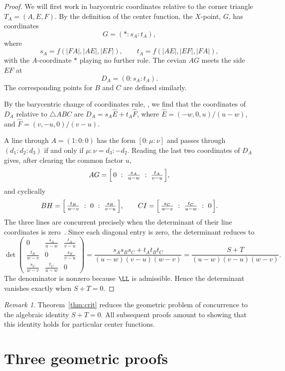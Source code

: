 \documentclass[12pt,a4paper]{amsart}
\theoremstyle{remark}
\newtheorem{remark}[theorem]{Remark}
\begin{document}
\begin{proof}
We will first work in barycentric coordinates relative to the corner triangle
$T_A=(A,E,F)$.
By the definition of the center function, the $X$-point, $G$, has coordinates
\[
G=(*:s_A:t_A),
\]
where
\[
s_A=f(|FA|,|AE|,|EF|),\qquad
t_A=f(|AE|,|EF|,|FA|),
\]
with the $A$-coordinate $\ast$ playing no further role.
The cevian $AG$ meets the side $EF$ at
\[
D_A=(0:s_A:t_A).
\]
The corresponding points for $B$ and $C$ are defined similarly.

By the barycentric change of coordinates rule, \cite[eq.~(10)]{Grozdev},
we find that the coordinates of $D_A$ relative to $\triangle ABC$ are $D_A=s_A\widehat E+t_A\widehat F$,
where $\widehat E=(-w,0,u)/(u-w)$, and $\widehat F=(v,-u,0)/(v-u)$.

A line through
$A=(1:0:0)$ has the form $[0:\mu:\nu]$ and passes through $(d_1:d_2:d_3)$ if and only if
$\mu:\nu=d_3:-d_2$.
Reading the last two coordinates of
$D_A$ gives, after clearing the common factor $u$,
\[
   AG=\Bigl[\,0\ :\ \tfrac{s_A}{u-w}\ :\ \tfrac{t_A}{v-u}\,\Bigr],
\]
and cyclically
\[
   BH=\Bigl[\,\tfrac{t_B}{w-v}\ :\ 0\ :\ \tfrac{s_B}{v-u}\,\Bigr],\qquad
   CI=\Bigl[\,\tfrac{s_C}{w-v}\ :\ \tfrac{t_C}{u-w}\ :\ 0\,\Bigr].
\]
The three lines are concurrent precisely when the determinant of their line
coordinates is zero~\cite[eq~(6)]{Grozdev}.
Since each diagonal entry is zero, the determinant reduces to
\[
  \det\!\begin{pmatrix}
      0 & \frac{s_A}{u-w} & \frac{t_A}{v-u}\\[2pt]
      \frac{t_B}{w-v} & 0 & \frac{s_B}{v-u}\\[2pt]
      \frac{s_C}{w-v} & \frac{t_C}{u-w} & 0
  \end{pmatrix}
  =\frac{s_As_Bs_C+t_At_Bt_C}{(u-w)(v-u)(w-v)}
  =\frac{S+T}{(u-w)(v-u)(w-v)} .
\]
The denominator is nonzero because $\LL$ is admissible.
Hence the determinant vanishes exactly when
$S+T=0$.
\end{proof}

\begin{remark}
Theorem~\ref{thm:crit} reduces the geometric problem of concurrence to the algebraic
identity $S+T=0$.
All subsequent proofs amount to showing that this identity holds for particular
center functions.
\end{remark}

\section{Three geometric proofs}
\label{section:geom}
\end{document}
